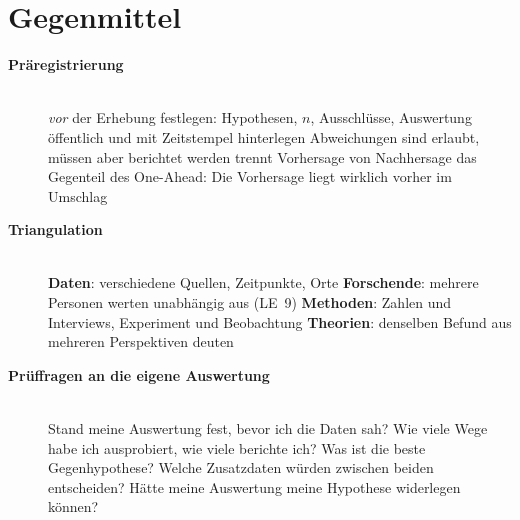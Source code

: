 \section{Gegenmittel}
\begin{description}
\item[{\rot\bf Präregistrierung}]~\\[-\lblskip]
\bi
  \ite \emph{vor} der Erhebung festlegen: Hypothesen, $n$, Ausschlüsse,
    Auswertung
  \ite öffentlich und mit Zeitstempel hinterlegen
  \ite Abweichungen sind erlaubt, müssen aber berichtet werden
  \ite trennt Vorhersage von Nachhersage \parencite{nosek2018preregistration}
  \ite das Gegenteil des One-Ahead: Die Vorhersage liegt wirklich vorher
    im Umschlag
\ei
\os{\newpage}

\item[{\rot\bf Triangulation}]~\\[-\lblskip]
\bi
  \ite \textbf{Daten}: verschiedene Quellen, Zeitpunkte, Orte
  \ite \textbf{Forschende}: mehrere Personen werten unabhängig aus (LE~9)
  \ite \textbf{Methoden}: Zahlen und Interviews, Experiment und Beobachtung
  \ite \textbf{Theorien}: denselben Befund aus mehreren Perspektiven
    deuten \parencite{denzin1970research}
\ei
\os{\newpage}

\item[{\rot\bf Prüffragen an die eigene Auswertung}]~\\[-\lblskip]
\bi
  \ite Stand meine Auswertung fest, bevor ich die Daten sah?
  \ite Wie viele Wege habe ich ausprobiert, wie viele berichte ich?
  \ite Was ist die beste Gegenhypothese?
  \ite Welche Zusatzdaten würden zwischen beiden entscheiden?
  \ite Hätte meine Auswertung meine Hypothese widerlegen können?
\ei
\os{\newpage}
\end{description}

